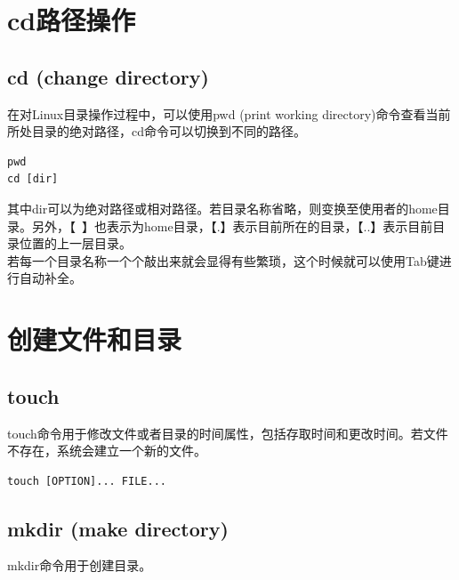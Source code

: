 \documentclass[12pt, openany, oneside]{book}
\begin{document}
\newpage

\section{cd路径操作}

\subsection{cd (change directory)}

在对Linux目录操作过程中，可以使用pwd (print working directory)命令查看当前所处目录的绝对路径，cd命令可以切换到不同的路径。

\vspace{-0.5cm}

\begin{lstlisting}
pwd
cd [dir]
\end{lstlisting}

其中dir可以为绝对路径或相对路径。若目录名称省略，则变换至使用者的home目录。另外，【~】也表示为home目录，【.】表示目前所在的目录，【..】表示目前目录位置的上一层目录。\\

若每一个目录名称一个个敲出来就会显得有些繁琐，这个时候就可以使用Tab键进行自动补全。

\newpage

\section{创建文件和目录}

\subsection{touch}

touch命令用于修改文件或者目录的时间属性，包括存取时间和更改时间。若文件不存在，系统会建立一个新的文件。

\vspace{-0.5cm}

\begin{lstlisting}
touch [OPTION]... FILE...
\end{lstlisting}

\subsection{mkdir (make directory)}

mkdir命令用于创建目录。

\vspace{-0.5cm}
\end{document}
